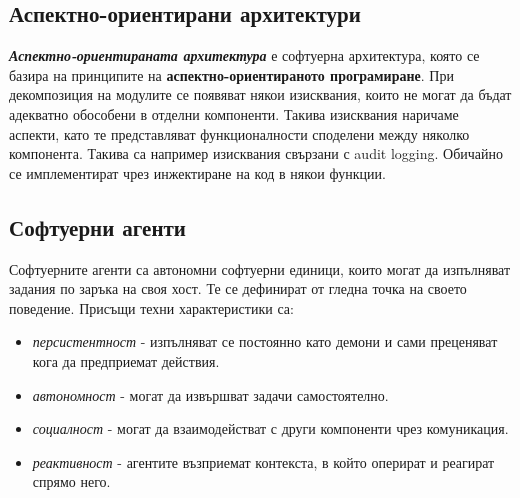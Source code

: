 \documentclass[fleqn,12pt]{article}
\begin{document}
\subsection{Аспектно-ориентирани архитектури}

\textbf{\textit{Аспектно-ориентираната архитектура}} е софтуерна архитектура, която се базира на принципите на \textbf{аспектно-ориентираното програмиране}.
При декомпозиция на модулите се появяват някои изисквания, които не могат да бъдат адекватно обособени в отделни компоненти.
Такива изисквания наричаме аспекти, като те представляват функционалности споделени между няколко компонента.
Такива са например изисквания свързани с audit logging.
Обичайно се имплементират чрез инжектиране на код в някои функции.

\subsection{Софтуерни агенти}

Софтуерните агенти са автономни софтуерни единици, които могат да изпълняват задания по заръка на своя хост.
Те се дефинират от гледна точка на своето поведение.
Присъщи техни характеристики са:
\begin{itemize}
    \item \textit{персистентност} - изпълняват се постоянно като демони и сами преценяват кога да предприемат действия.
    \item \textit{автономност} - могат да извършват задачи самостоятелно.
    \item \textit{социалност} - могат да взаимодействат с други компоненти чрез комуникация.
    \item \textit{реактивност} - агентите възприемат контекста, в който оперират и реагират спрямо него.
\end{itemize}
\end{document}
